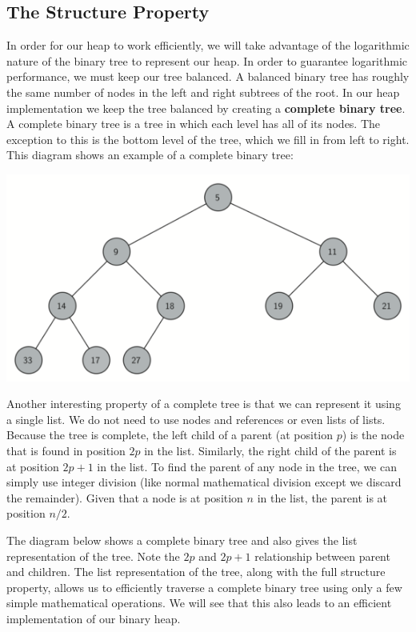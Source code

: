 \documentclass[11pt]{article}
\begin{document}
\hypertarget{the-structure-property}{%
\subsection{The Structure Property}\label{the-structure-property}}

In order for our heap to work efficiently, we will take advantage of the
logarithmic nature of the binary tree to represent our heap. In order to
guarantee logarithmic performance, we must keep our tree balanced. A
balanced binary tree has roughly the same number of nodes in the left
and right subtrees of the root. In our heap implementation we keep the
tree balanced by creating a \textbf{complete binary tree}. A complete
binary tree is a tree in which each level has all of its nodes. The
exception to this is the bottom level of the tree, which we fill in from
left to right. This diagram shows an example of a complete binary tree:

\includegraphics{figures/complete-binary-tree.png}

Another interesting property of a complete tree is that we can represent
it using a single list. We do not need to use nodes and references or
even lists of lists. Because the tree is complete, the left child of a
parent (at position \(p\)) is the node that is found in position \(2p\)
in the list. Similarly, the right child of the parent is at position
\(2p + 1\) in the list. To find the parent of any node in the tree, we
can simply use integer division (like normal mathematical division
except we discard the remainder). Given that a node is at position \(n\)
in the list, the parent is at position \(n/2\).

The diagram below shows a complete binary tree and also gives the list
representation of the tree. Note the \(2p\) and \(2p+1\) relationship
between parent and children. The list representation of the tree, along
with the full structure property, allows us to efficiently traverse a
complete binary tree using only a few simple mathematical operations. We
will see that this also leads to an efficient implementation of our
binary heap.
\end{document}
